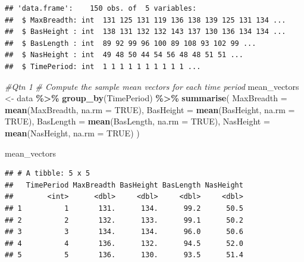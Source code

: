 \documentclass[
]{article}
\newenvironment{Shaded}{\begin{snugshade}}{\end{snugshade}}
\newcommand{\AttributeTok}[1]{\textcolor[rgb]{0.13,0.29,0.53}{#1}}
\newcommand{\CommentTok}[1]{\textcolor[rgb]{0.56,0.35,0.01}{\textit{#1}}}
\newcommand{\ConstantTok}[1]{\textcolor[rgb]{0.56,0.35,0.01}{#1}}
\newcommand{\FunctionTok}[1]{\textcolor[rgb]{0.13,0.29,0.53}{\textbf{#1}}}
\newcommand{\NormalTok}[1]{#1}
\newcommand{\OtherTok}[1]{\textcolor[rgb]{0.56,0.35,0.01}{#1}}
\newcommand{\SpecialCharTok}[1]{\textcolor[rgb]{0.81,0.36,0.00}{\textbf{#1}}}
\begin{document}
\begin{verbatim}
## 'data.frame':    150 obs. of  5 variables:
##  $ MaxBreadth: int  131 125 131 119 136 138 139 125 131 134 ...
##  $ BasHeight : int  138 131 132 132 143 137 130 136 134 134 ...
##  $ BasLength : int  89 92 99 96 100 89 108 93 102 99 ...
##  $ NasHeight : int  49 48 50 44 54 56 48 48 51 51 ...
##  $ TimePeriod: int  1 1 1 1 1 1 1 1 1 1 ...
\end{verbatim}

\begin{Shaded}
\begin{Highlighting}[]
\CommentTok{\#Qtn 1 }
\CommentTok{\# Compute the sample mean vectors for each time period}
\NormalTok{mean\_vectors }\OtherTok{\textless{}{-}}\NormalTok{ data }\SpecialCharTok{\%\textgreater{}\%}
  \FunctionTok{group\_by}\NormalTok{(TimePeriod) }\SpecialCharTok{\%\textgreater{}\%}
  \FunctionTok{summarise}\NormalTok{(}
    \AttributeTok{MaxBreadth =} \FunctionTok{mean}\NormalTok{(MaxBreadth, }\AttributeTok{na.rm =} \ConstantTok{TRUE}\NormalTok{),}
    \AttributeTok{BasHeight =} \FunctionTok{mean}\NormalTok{(BasHeight, }\AttributeTok{na.rm =} \ConstantTok{TRUE}\NormalTok{),}
    \AttributeTok{BasLength =} \FunctionTok{mean}\NormalTok{(BasLength, }\AttributeTok{na.rm =} \ConstantTok{TRUE}\NormalTok{),}
    \AttributeTok{NasHeight =} \FunctionTok{mean}\NormalTok{(NasHeight, }\AttributeTok{na.rm =} \ConstantTok{TRUE}\NormalTok{)}
\NormalTok{  )}

\NormalTok{mean\_vectors}
\end{Highlighting}
\end{Shaded}

\begin{verbatim}
## # A tibble: 5 x 5
##   TimePeriod MaxBreadth BasHeight BasLength NasHeight
##        <int>      <dbl>     <dbl>     <dbl>     <dbl>
## 1          1       131.      134.      99.2      50.5
## 2          2       132.      133.      99.1      50.2
## 3          3       134.      134.      96.0      50.6
## 4          4       136.      132.      94.5      52.0
## 5          5       136.      130.      93.5      51.4
\end{verbatim}
\end{document}
